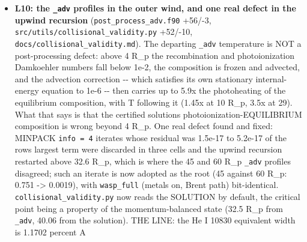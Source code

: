 \documentclass[english,a4paper]{my_memo}
\begin{document}
\begin{itemize}
  both certified, the critical point is inside (40.05, 40.08) and the two
  agree with each other to better than 0.1 percent everywhere: log10 Mdot
  7.8737, 7.8740, 7.8735 at 30, 45 and 60 R\_p (5e-4 dex), the He 2\^{}3S column
  within 0.23 percent, the equivalent width within 1.7 percent (1.1702,
  1.1504, 1.1537 percent A) and the FWHM not at all. The 30 R\_p PROFILE is
  contaminated outside 10 R\_p (T +25 percent, rho +29 percent, v -22 percent
  at 28 R\_p; 1.9 percent at 8 R\_p, 0.14 percent at 2). Conditions carried by
  every campaign number: Mdot is quotable as the flux the interior sets, the
  He 10830 numbers carry a 1.7 percent boundary systematic, nothing above
  10 R\_p is quoted from a 30 R\_p run, and above 7.65 R\_p -\/- the exobase of
  the extended solutions sitting at 29 R\_p, below the critical point -\/- no
  radius is a validated continuum result. Found on the way: the \texttt{\_adv}
  profiles diverge from the solution in the outer wind (429 K against 1513 K
  at 29 R\_p), which is item L10.
\item
  \textbf{L10: the \texttt{\_adv} profiles in the outer wind, and one real defect in the
  upwind recursion} (\texttt{post\_process\_adv.f90} +56/-3,
  \texttt{src/utils/collisional\_validity.py} +52/-10, \texttt{docs/collisional\_validity.md}).
  The departing \texttt{\_adv} temperature is NOT a post-processing defect: above
  4 R\_p the recombination and photoionization Damkoehler numbers fall below
  1e-2, the composition is frozen and advected, and the advection correction
  -\/- which satisfies its own stationary internal-energy equation to 1e-6 -\/-
  then carries up to 5.9x the photoheating of the equilibrium composition,
  with T following it (1.45x at 10 R\_p, 3.5x at 29). What that says is that
  the certified solution\textquotesingle s photoionization-EQUILIBRIUM composition is wrong
  beyond 4 R\_p. One real defect found and fixed: MINPACK \texttt{info\ =\ 4} iterates
  whose residual was 1.5e-17 to 5.2e-17 of the row\textquotesingle s largest term were
  discarded in three cells and the upwind recursion restarted above 32.6 R\_p,
  which is where the 45 and 60 R\_p \texttt{\_adv} profiles disagreed; such an iterate
  is now adopted as the root (45 against 60 R\_p: 0.751 -\textgreater{} 0.0019), with
  \texttt{wasp\_full} (metals on, Brent path) bit-identical. \texttt{collisional\_validity.py}
  now reads the SOLUTION by default, the critical point being a property of
  the momentum-balanced state (32.5 R\_p from \texttt{\_adv}, 40.06 from the
  solution). THE LINE: the He I 10830 equivalent width is 1.1702 percent A

\end{itemize}
\end{document}

